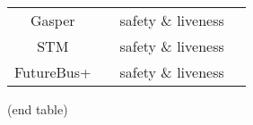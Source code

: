 \documentclass{article}
\begin{document}
\begin{center}
\begin{tabular}{ c c c c }
    Gasper & \cite{buterinCombiningGHOSTCasper2020} & safety \& liveness &
    \cite{neuEbbandFlowProtocolsResolution2021} \\

    STM & \cite{Imbs2011} & safety \& liveness &
    \cite{Belyaev2010} \\

    FutureBus+ & \cite{IEEE8961Futurebus} & safety \& liveness &
    \cite{ClarkeGHJLMN93} \\

    \bottomrule
\end{tabular}
\end{center}

\begin{center}
    {\footnotesize \color{white} (end table)}
\end{center}

\newpage
\printbibliography
\end{document}
